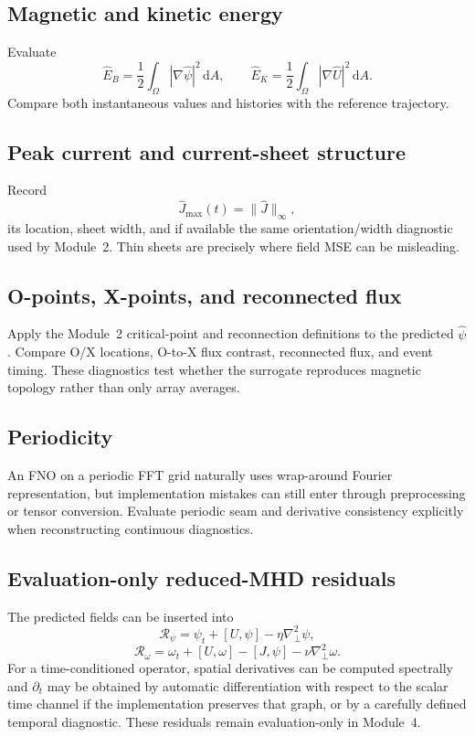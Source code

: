 \documentclass[11pt]{article}
\newcommand{\dd}{\mathrm{d}}
\newcommand{\bracket}[2]{\left[#1,#2\right]}
\newcommand{\Lap}{\nabla_\perp^2}
\newcommand{\Rpsi}{\mathcal{R}_{\psi}}
\newcommand{\Romega}{\mathcal{R}_{\omega}}
\begin{document}
\subsection{Magnetic and kinetic energy}
Evaluate
\[
\widehat E_B=\frac12\int_\Omega|\nabla\widehat\psi|^2\,\dd A,
\qquad
\widehat E_K=\frac12\int_\Omega|\nabla\widehat U|^2\,\dd A.
\]
Compare both instantaneous values and histories with the reference trajectory.

\subsection{Peak current and current-sheet structure}
Record
\[
\widehat J_{\max}(t)=\|\widehat J\|_\infty,
\]
its location, sheet width, and if available the same orientation/width diagnostic used by Module~2. Thin sheets are precisely where field MSE can be misleading.

\subsection{O-points, X-points, and reconnected flux}
Apply the Module~2 critical-point and reconnection definitions to the predicted $\widehat\psi$. Compare O/X locations, O-to-X flux contrast, reconnected flux, and event timing. These diagnostics test whether the surrogate reproduces magnetic topology rather than only array averages.

\subsection{Periodicity}
An FNO on a periodic FFT grid naturally uses wrap-around Fourier representation, but implementation mistakes can still enter through preprocessing or tensor conversion. Evaluate periodic seam and derivative consistency explicitly when reconstructing continuous diagnostics.

\subsection{Evaluation-only reduced-MHD residuals}
The predicted fields can be inserted into
\[
\Rpsi=\psi_t+\bracket{U}{\psi}-\eta\Lap\psi,
\]
\[
\Romega=\omega_t+\bracket{U}{\omega}-\bracket{J}{\psi}-\nu\Lap\omega.
\]
For a time-conditioned operator, spatial derivatives can be computed spectrally and $\partial_t$ may be obtained by automatic differentiation with respect to the scalar time channel if the implementation preserves that graph, or by a carefully defined temporal diagnostic. These residuals remain evaluation-only in Module~4.
\end{document}
